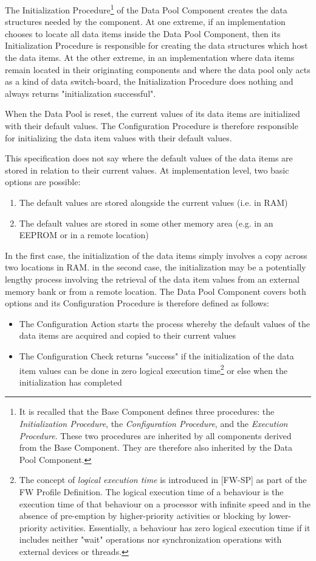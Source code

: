 \documentclass{pnp_article}
\begin{document}
The Initialization Procedure\footnote{It is recalled that the Base Component defines three procedures: the \textit{Initialization Procedure}, the \textit{Configuration Procedure}, and the \textit{Execution Procedure}. These two procedures are inherited by all components derived from the Base Component. They are therefore also inherited by the Data Pool Component.} of the Data Pool Component creates the data structures needed by the component. At one extreme, if an implementation chooses to locate all data items inside the Data Pool Component, then its Initialization Procedure is responsible for creating the data structures which host the data items. At the other extreme, in an implementation where data items remain located in their originating components and where the data pool only acts as a kind of data switch-board, the Initialization Procedure does nothing and always returns "initialization successful".

When the Data Pool is reset, the current values of its data items are initialized with their default values. The Configuration Procedure is therefore responsible for initializing the data item values with their default values. 

This specification does not say where the default values of the data items are stored in relation to their current values. At implementation level, two basic options are possible:

\begin{enumerate}
\item The default values are stored alongside the current values (i.e. in RAM)
\item The default values are stored in some other memory area (e.g. in an EEPROM or in a remote location)
\end{enumerate}

In the first case, the initialization of the data items simply involves a copy across two locations in RAM. in the second case, the initialization may be a potentially lengthy process involving the retrieval of the data item values from an external memory bank or from a remote location. The Data Pool Component covers both options and its Configuration Procedure is therefore defined as follows:

\begin{itemize}
\item The Configuration Action starts the process whereby the default values of the data items are acquired and copied to their current values
\item The Configuration Check returns "success" if the initialization of the data item values can be done in zero logical execution time\footnote{The concept of \textit{logical execution time} is introduced in [FW-SP] as part of the FW Profile Definition. The logical execution time of a behaviour is the execution time of that behaviour on a processor with infinite speed and in the absence of pre-emption by higher-priority activities or blocking by lower-priority activities. Essentially, a behaviour has zero logical execution time if it includes neither "wait" operations nor synchronization operations with external devices or threads.} or else when the initialization has completed 
\end{itemize}
\end{document}
